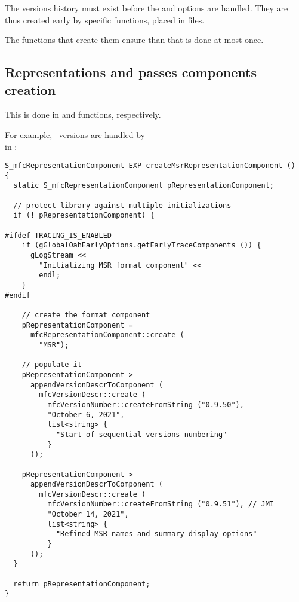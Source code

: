 The versions history must exist before the  and  options are handled. They are thus created early by specific functions, placed in  files.

The functions that create them ensure than that is done at most once.


\subsection{Representations and passes components creation}\label{Representations and passes components creation}

This is done in  and  functions, respectively.

For example, \msrRepr\ versions are handled by  \\
in :
\begin{lstlisting}[language=CPlusPlus]
S_mfcRepresentationComponent EXP createMsrRepresentationComponent ()
{
  static S_mfcRepresentationComponent pRepresentationComponent;

  // protect library against multiple initializations
  if (! pRepresentationComponent) {

#ifdef TRACING_IS_ENABLED
    if (gGlobalOahEarlyOptions.getEarlyTraceComponents ()) {
      gLogStream <<
        "Initializing MSR format component" <<
        endl;
    }
#endif

    // create the format component
    pRepresentationComponent =
      mfcRepresentationComponent::create (
        "MSR");

    // populate it
    pRepresentationComponent->
      appendVersionDescrToComponent (
        mfcVersionDescr::create (
          mfcVersionNumber::createFromString ("0.9.50"),
          "October 6, 2021",
          list<string> {
            "Start of sequential versions numbering"
          }
      ));

    pRepresentationComponent->
      appendVersionDescrToComponent (
        mfcVersionDescr::create (
          mfcVersionNumber::createFromString ("0.9.51"), // JMI
          "October 14, 2021",
          list<string> {
            "Refined MSR names and summary display options"
          }
      ));
  }

  return pRepresentationComponent;
}
\end{lstlisting}

